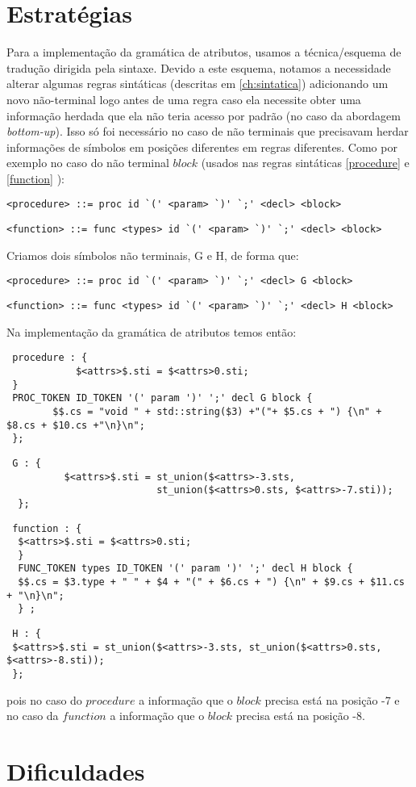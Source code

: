 \section{Estratégias}
Para a implementação da gramática de atributos, usamos a técnica/esquema de tradução dirigida pela sintaxe. Devido a este esquema, notamos a necessidade alterar algumas regras sintáticas (descritas em \ref{ch:sintatica}) adicionando um novo não-terminal logo antes de uma regra caso ela necessite obter uma informação herdada que ela não teria acesso por padrão (no caso da abordagem \textit{bottom-up}). Isso só foi necessário no caso de não terminais que precisavam herdar informações de símbolos em posições diferentes em regras diferentes. Como por exemplo no caso do não terminal $block$ (usados nas regras sintáticas \ref{procedure} e \ref{function}  ):

\begin{lstlisting}[frame=single, language=pie]
<procedure> ::= proc id `(' <param> `)' `;' <decl> <block>
\end{lstlisting}

\begin{lstlisting}[frame=single, language=pie]
<function> ::= func <types> id `(' <param> `)' `;' <decl> <block>
\end{lstlisting}
 Criamos dois símbolos não terminais, G e H, de forma que:
 \begin{lstlisting}[frame=single, language=pie]
 <procedure> ::= proc id `(' <param> `)' `;' <decl> G <block>
 \end{lstlisting}
 
 \begin{lstlisting}[frame=single, language=pie, basicstyle=\small ]
 <function> ::= func <types> id `(' <param> `)' `;' <decl> H <block>
  \end{lstlisting}
  
  Na implementação da gramática de atributos temos então:
 
 \begin{verbatim}
 procedure : {
 			$<attrs>$.sti = $<attrs>0.sti; 
 }
 PROC_TOKEN ID_TOKEN '(' param ')' ';' decl G block {
 		$$.cs = "void " + std::string($3) +"("+ $5.cs + ") {\n" + $8.cs + $10.cs +"\n}\n";
 };
  \end{verbatim}
  \begin{verbatim}
 G : {
		  $<attrs>$.sti = st_union($<attrs>-3.sts,
		                  st_union($<attrs>0.sts, $<attrs>-7.sti)); 
  };
  \end{verbatim}
  \begin{verbatim}
 function : {
  $<attrs>$.sti = $<attrs>0.sti; 
  }
  FUNC_TOKEN types ID_TOKEN '(' param ')' ';' decl H block {
  $$.cs = $3.type + " " + $4 + "(" + $6.cs + ") {\n" + $9.cs + $11.cs + "\n}\n"; 
  } ;
  \end{verbatim}
  \begin{verbatim}
 H : { 
 $<attrs>$.sti = st_union($<attrs>-3.sts, st_union($<attrs>0.sts, $<attrs>-8.sti)); 
 };
 \end{verbatim}
pois no caso do $procedure$ a informação que o $block$ precisa está na posição -7 e no caso da $function$ a informação que o $block$ precisa está na posição -8.

\section{Dificuldades}